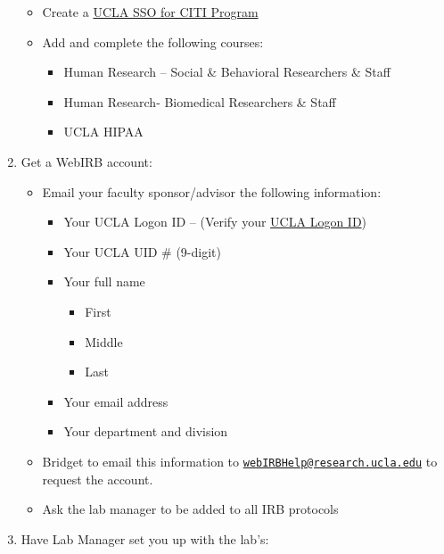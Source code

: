 \documentclass[]{book}
\providecommand{\tightlist}{%
  \setlength{\itemsep}{0pt}\setlength{\parskip}{0pt}}
\begin{document}
\begin{enumerate}
  \begin{itemize}
  \tightlist
  \item
    Create a
    \href{http://ora.research.ucla.edu/OHRPP/Documents/Education/SSO_CITI_New_Acct.pdf}{UCLA
    SSO for CITI Program}
  \item
    Add and complete the following courses:

    \begin{itemize}
    \tightlist
    \item
      Human Research -- Social \& Behavioral Researchers \& Staff
    \item
      Human Research- Biomedical Researchers \& Staff
    \item
      UCLA HIPAA
    \end{itemize}
  \end{itemize}
\item
  Get a WebIRB account:

  \begin{itemize}
  \tightlist
  \item
    Email your faculty sponsor/advisor the following information:

    \begin{itemize}
    \tightlist
    \item
      Your UCLA Logon ID -- (Verify your
      \href{https://accounts.iam.ucla.edu/lookup}{UCLA Logon ID})
    \item
      Your UCLA UID \# (9-digit)
    \item
      Your full name

      \begin{itemize}
      \tightlist
      \item
        First
      \item
        Middle
      \item
        Last
      \end{itemize}
    \item
      Your email address
    \item
      Your department and division
    \end{itemize}
  \item
    Bridget to email this information to
    \href{mailto:webIRBHelp@research.ucla.edu}{\nolinkurl{webIRBHelp@research.ucla.edu}}
    to request the account.
  \item
    Ask the lab manager to be added to all IRB protocols
  \end{itemize}
\item
  Have Lab Manager set you up with the lab's:


\end{enumerate}
\end{document}

